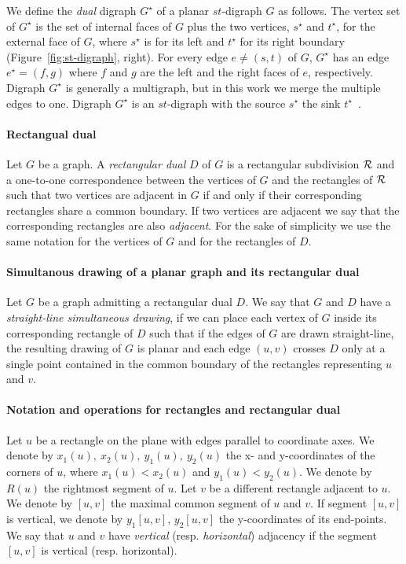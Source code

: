 \documentclass{llncs}
\begin{document}
We define the \emph{dual} digraph $G^\star$ of a planar $st$-digraph $G$ as follows. The vertex set of $G^\star$ is the set of internal faces of $G$ plus the two vertices, $s^\star$ and $t^\star$, for the external face of $G$, where $s^\star$ is for its left  and $t^\star$ for its right boundary (Figure~\ref{fig:st-digraph}, right). For every edge $e\neq (s,t)$ of $G$, $G^\star$ has an edge $e^\star=(f,g)$ where $f$ and $g$ are the left and the right faces of $e$, respectively.  Digraph $G^\star$ is generally a multigraph, but in this work we merge the multiple edges to one. Digraph $G^\star$ is an $st$-digraph with the source $s^\star$ the sink $t^\star$~\cite{diBattistaThebook}. 


\paragraph{\bf Rectangual dual}  Let $G$ be a graph. A \emph{rectangular dual} $D$ of $G$ is a rectangular subdivision  $\cal R$ and a one-to-one correspondence between the vertices of $G$ and the rectangles of $\cal R$ such that two vertices are adjacent in $G$ if and only if their corresponding rectangles share a common boundary.  If two vertices are adjacent we say that the corresponding rectangles are also \emph{adjacent}. For the sake of simplicity we use the same notation for the vertices of $G$ and for the rectangles of $D$. 


\paragraph{\bf Simultanous drawing of a planar graph and its rectangular dual}
Let $G$ be a graph admitting a rectangular dual $D$. We say that $G$ and $D$ have a \emph{straight-line simultaneous drawing}, if we can place each vertex of $G$ inside its corresponding rectangle of $D$ such that if the edges of $G$ are drawn straight-line, the resulting drawing of $G$ is planar and each edge $(u,v)$ crosses $D$ only at a single point contained in the common boundary of the rectangles representing $u$ and $v$.


\paragraph{\bf Notation and operations for rectangles and rectangular dual} Let $u$ be a rectangle on the plane with edges parallel to coordinate axes. We denote by $x_1(u),~x_2(u),~y_1(u),~y_2(u)$ the x- and y-coordinates of the corners of $u$, where $x_1(u)<x_2(u)$ and $y_1(u)<y_2(u)$. We denote by $R(u)$ the rightmost segment of $u$. Let $v$ be a different rectangle adjacent to $u$. We
denote by $[u,v]$ the maximal common segment of $u$ and $v$.  If segment $[u,v]$ is vertical, we denote by $y_1[u,v]$,  $y_2[u,v]$ the y-coordinates of its end-points. We say that $u$ and $v$ have \emph{vertical} (resp. \emph{horizontal}) adjacency if the segment $[u,v]$ is vertical (resp. horizontal).
\end{document}
